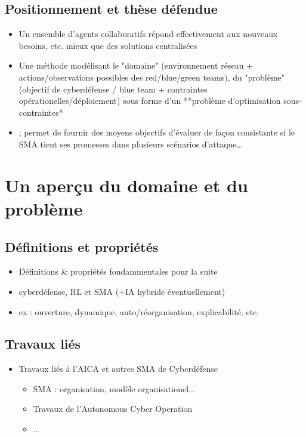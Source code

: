 \documentclass{article}
\begin{document}
\subsection{Positionnement et thèse défendue}
\begin{itemize}

    \item Un ensemble d’agents collaboratifs répond effectivement aux nouveaux besoins, etc. mieux que des solutions centralisées
    \item Une méthode modélisant le "domaine" (environnement réseau + actions/observations possibles des red/blue/green teams), du "problème" (objectif de cyberdéfense / blue team + contraintes opérationelles/déploiement) sous forme d'un **problème d'optimisation sous-contraintes*\item ; permet de fournir des moyens objectifs d’évaluer de façon consistante si le SMA tient ses promesses dans plusieurs scénarios d’attaque…
\end{itemize}




\section{Un aperçu du domaine et du problème }

\subsection{Définitions et propriétés}
\begin{itemize}

    \item Définitions \& propriétés fondammentales pour la suite
    \item cyberdéfense, RL et SMA (+IA hybride éventuellement)
    \item ex : ouverture, dynamique, auto/réorganisation, explicabilité, etc.
\end{itemize}
\subsection{Travaux liés}
\begin{itemize}

    \item Travaux liés à l’AICA et autres SMA de Cyberdéfense
          \begin{itemize}
              \item SMA : organisation, modèle organisationel...
              \item Travaux de l'Autonomous Cyber Operation
              \item ...
          \end{itemize}
\end{itemize}
\end{document}
